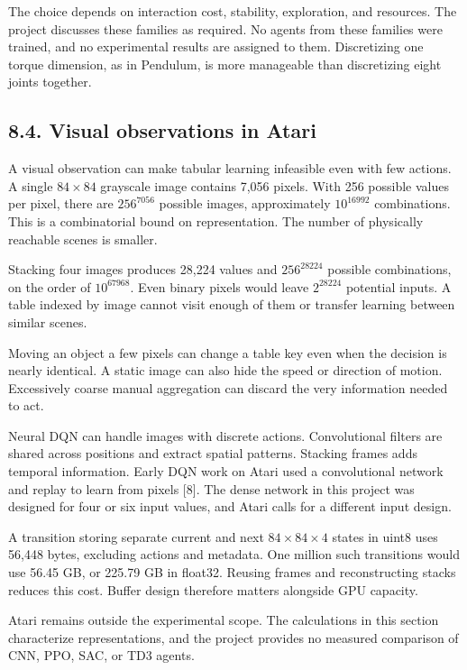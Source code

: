 \documentclass[10pt,a4paper,twocolumn]{extarticle}
\begin{document}
The choice depends on interaction cost, stability, exploration, and resources. The project discusses these families as required. No agents from these families were trained, and no experimental results are assigned to them. Discretizing one torque dimension, as in Pendulum, is more manageable than discretizing eight joints together.

\clearpage
\subsection*{8.4. Visual observations in Atari}
A visual observation can make tabular learning infeasible even with few actions. A single $84\times84$ grayscale image contains 7,056 pixels. With 256 possible values per pixel, there are $256^{7056}$ possible images, approximately $10^{16992}$ combinations. This is a combinatorial bound on representation. The number of physically reachable scenes is smaller.

Stacking four images produces 28,224 values and $256^{28224}$ possible combinations, on the order of $10^{67968}$. Even binary pixels would leave $2^{28224}$ potential inputs. A table indexed by image cannot visit enough of them or transfer learning between similar scenes.

Moving an object a few pixels can change a table key even when the decision is nearly identical. A static image can also hide the speed or direction of motion. Excessively coarse manual aggregation can discard the very information needed to act.

Neural DQN can handle images with discrete actions. Convolutional filters are shared across positions and extract spatial patterns. Stacking frames adds temporal information. Early DQN work on Atari used a convolutional network and replay to learn from pixels [8]. The dense network in this project was designed for four or six input values, and Atari calls for a different input design.

A transition storing separate current and next $84\times84\times4$ states in uint8 uses 56,448 bytes, excluding actions and metadata. One million such transitions would use 56.45 GB, or 225.79 GB in float32. Reusing frames and reconstructing stacks reduces this cost. Buffer design therefore matters alongside GPU capacity.

Atari remains outside the experimental scope. The calculations in this section characterize representations, and the project provides no measured comparison of CNN, PPO, SAC, or TD3 agents.
\end{document}
